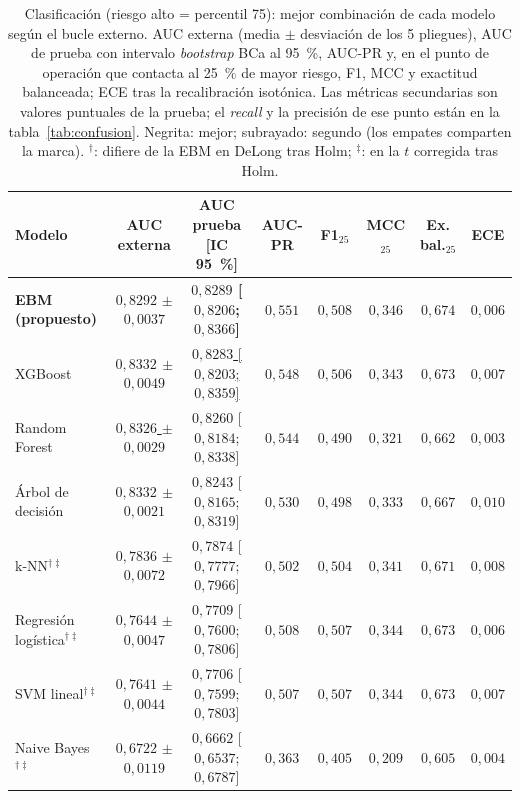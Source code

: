\begin{table}[tbp]
  \centering\scriptsize\setlength{\tabcolsep}{3pt}
  \caption{Clasificación (riesgo alto = percentil 75): mejor combinación de cada modelo según el bucle externo. AUC externa (media $\pm$ desviación de los 5 pliegues), AUC de prueba con intervalo \emph{bootstrap} BCa al 95~\%, AUC-PR y, en el punto de operación que contacta al 25~\% de mayor riesgo, F1, MCC y exactitud balanceada; ECE tras la recalibración isotónica. Las métricas secundarias son valores puntuales de la prueba; el \emph{recall} y la precisión de ese punto están en la tabla~\ref{tab:confusion}. Negrita: mejor; subrayado: segundo (los empates comparten la marca). $^{\dagger}$: difiere de la EBM en DeLong tras Holm; $^{\ddagger}$: en la $t$ corregida tras Holm.}
  \label{tab:clasificacion}
  \begin{tabular}{@{}l c c c c c c c@{}}
    \toprule
    Modelo & AUC externa & AUC prueba [IC 95~\%] & AUC-PR & F1$_{25}$ & MCC$_{25}$ & Ex. bal.$_{25}$ & ECE \\
    \midrule
    \textbf{EBM (propuesto)} & $0{,}8292$ $\pm$ $0{,}0037$ & {\boldmath\textbf{$0{,}8289$ [$0{,}8206$; $0{,}8366$]}} & {\boldmath\textbf{$0{,}551$}} & {\boldmath\textbf{$0{,}508$}} & {\boldmath\textbf{$0{,}346$}} & {\boldmath\textbf{$0{,}674$}} & $0{,}006$ \\
    XGBoost & {\boldmath\textbf{$0{,}8332$ $\pm$ $0{,}0049$}} & \underline{$0{,}8283$ [$0{,}8203$; $0{,}8359$]} & \underline{$0{,}548$} & $0{,}506$ & $0{,}343$ & \underline{$0{,}673$} & $0{,}007$ \\
    Random Forest & \underline{$0{,}8326$ $\pm$ $0{,}0029$} & $0{,}8260$ [$0{,}8184$; $0{,}8338$] & $0{,}544$ & $0{,}490$ & $0{,}321$ & $0{,}662$ & {\boldmath\textbf{$0{,}003$}} \\
    Árbol de decisión & {\boldmath\textbf{$0{,}8332$ $\pm$ $0{,}0021$}} & $0{,}8243$ [$0{,}8165$; $0{,}8319$] & $0{,}530$ & $0{,}498$ & $0{,}333$ & $0{,}667$ & $0{,}010$ \\
    k-NN$^{\dagger\ddagger}$ & $0{,}7836$ $\pm$ $0{,}0072$ & $0{,}7874$ [$0{,}7777$; $0{,}7966$] & $0{,}502$ & $0{,}504$ & $0{,}341$ & $0{,}671$ & $0{,}008$ \\
    Regresión logística$^{\dagger\ddagger}$ & $0{,}7644$ $\pm$ $0{,}0047$ & $0{,}7709$ [$0{,}7600$; $0{,}7806$] & $0{,}508$ & \underline{$0{,}507$} & \underline{$0{,}344$} & \underline{$0{,}673$} & $0{,}006$ \\
    SVM lineal$^{\dagger\ddagger}$ & $0{,}7641$ $\pm$ $0{,}0044$ & $0{,}7706$ [$0{,}7599$; $0{,}7803$] & $0{,}507$ & \underline{$0{,}507$} & \underline{$0{,}344$} & \underline{$0{,}673$} & $0{,}007$ \\
    Naive Bayes$^{\dagger\ddagger}$ & $0{,}6722$ $\pm$ $0{,}0119$ & $0{,}6662$ [$0{,}6537$; $0{,}6787$] & $0{,}363$ & $0{,}405$ & $0{,}209$ & $0{,}605$ & \underline{$0{,}004$} \\
    \bottomrule
  \end{tabular}
\end{table}
